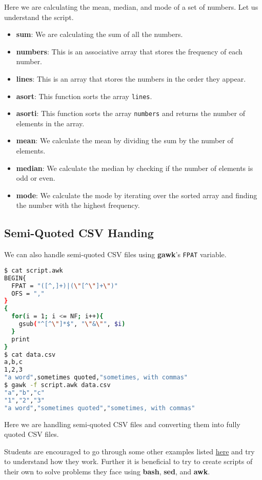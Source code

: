 Here we are calculating the mean, median, and mode of a set of numbers.
Let us understand the script.

\begin{itemize}
  \item \textbf{sum}: We are calculating the sum of all the numbers.
  \item \textbf{numbers}: This is an associative array that stores the frequency of each number.
  \item \textbf{lines}: This is an array that stores the numbers in the order they appear.
  \item \textbf{asort}: This function sorts the array \lstinline|lines|.
  \item \textbf{asorti}: This function sorts the array \lstinline|numbers| and returns the number of elements in the array.
  \item \textbf{mean}: We calculate the mean by dividing the sum by the number of elements.
  \item \textbf{median}: We calculate the median by checking if the number of elements is odd or even.
  \item \textbf{mode}: We calculate the mode by iterating over the sorted array and finding the number with the highest frequency.
\end{itemize}

\subsection{Semi-Quoted CSV Handing}

We can also handle semi-quoted CSV files using \textbf{gawk}'s \lstinline|FPAT| variable.

\begin{lstlisting}[language=bash]
$ cat script.awk
BEGIN{
  FPAT = "([^,]+)|(\"[^\"]+\")"
  OFS = ","
}
{
  for(i = 1; i <= NF; i++){
    gsub("^[^\"]*$", "\"&\"", $i)
  }
  print
}
$ cat data.csv
a,b,c
1,2,3
"a word",sometimes quoted,"sometimes, with commas"
$ gawk -f script.awk data.csv
"a","b","c"
"1","2","3"
"a word","sometimes quoted","sometimes, with commas"
\end{lstlisting}

Here we are handling semi-quoted CSV files and converting them into fully quoted CSV files.




Students are encouraged to go through some other examples listed
\href{https://www.pement.org/awk/awk1line.txt}{here} and try to understand how they work.
Further it is beneficial to try to create scripts of their own to solve problems they face using \textbf{bash}, \textbf{sed}, and \textbf{awk}.
